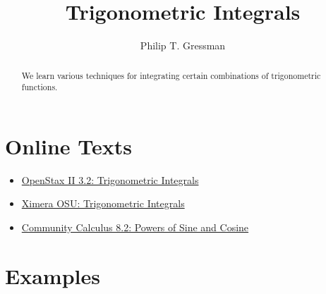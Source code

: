 \documentclass{ximera}
\title{Trigonometric Integrals}
\author{Philip T. Gressman}
\begin{document}
\begin{abstract}
We learn various techniques for integrating certain combinations of trigonometric functions.
\end{abstract}
\maketitle

\section*{Online Texts}
\begin{itemize}
\item \href{https://openstax.org/books/calculus-volume-2/pages/3-2-trigonometric-integrals}{OpenStax II 3.2: Trigonometric Integrals}
\item \href{https://ximera.osu.edu/mooculus/calculus2/trigonometricIntegrals/titlePage}{Ximera OSU: Trigonometric Integrals}
\item \href{https://www.whitman.edu/mathematics/calculus_online/section08.02.html}{Community Calculus 8.2: Powers of Sine and Cosine}
\end{itemize}

\section*{Examples}

\begin{example}

\end{example}

\begin{example}

\end{example}
\end{document}
